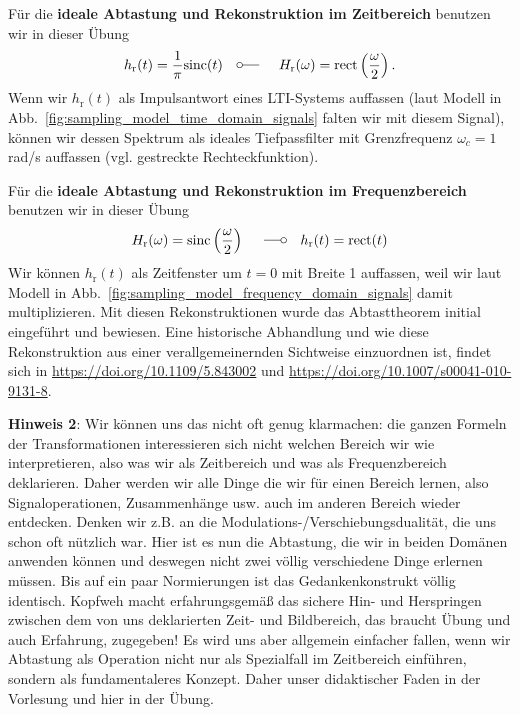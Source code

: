 Für die \textbf{ideale Abtastung und Rekonstruktion im Zeitbereich} benutzen
wir in dieser Übung
\begin{align}
h_\mathrm{r}(t) = \frac{1}{\pi}\text{sinc}(t)
\quad\fourier\quad
H_\mathrm{r}(\omega) = \text{rect}\left(\frac{\omega}{2}\right).
\end{align}
Wenn wir $h_\mathrm{r}(t)$ als Impulsantwort eines LTI-Systems auffassen (laut
Modell in Abb.~\ref{fig:sampling_model_time_domain_signals} falten wir mit diesem Signal), können wir
dessen Spektrum als ideales Tiefpassfilter mit Grenzfrequenz $\omega_c=1$ rad/s auffassen (vgl. gestreckte Rechteckfunktion).
%

Für die \textbf{ideale Abtastung und Rekonstruktion im Frequenzbereich} benutzen
wir in dieser Übung
\begin{align}
H_\mathrm{r}(\omega) = \text{sinc}\left( \frac{\omega}{2} \right)
\quad\Fourier\quad
h_\mathrm{r}(t)  = \text{rect}(t)
\end{align}
Wir können $h_\mathrm{r}(t)$ als Zeitfenster um $t=0$ mit Breite 1 auffassen,
weil wir laut Modell in Abb.~\ref{fig:sampling_model_frequency_domain_signals}
damit multiplizieren.
Mit diesen Rekonstruktionen wurde das Abtasttheorem initial eingeführt und
bewiesen. Eine historische Abhandlung und wie diese Rekonstruktion
aus einer verallgemeinernden Sichtweise einzuordnen ist, findet sich in
\url{https://doi.org/10.1109/5.843002} und
\url{https://doi.org/10.1007/s00041-010-9131-8}.

\textbf{Hinweis 2}: Wir können uns das nicht oft genug klarmachen: die ganzen
Formeln der Transformationen interessieren sich nicht welchen Bereich wir wie
interpretieren,
also was wir als Zeitbereich und was als Frequenzbereich deklarieren. Daher werden
wir alle Dinge die wir für einen Bereich lernen, also Signaloperationen, Zusammenhänge usw.
auch im anderen Bereich wieder entdecken. Denken wir z.B.
an die Modulations-/Verschiebungsdualität,
die uns schon oft nützlich war.
Hier ist es nun die Abtastung, die wir in beiden Domänen anwenden können und
deswegen nicht zwei völlig verschiedene Dinge erlernen müssen. Bis auf ein
paar Normierungen ist das Gedankenkonstrukt völlig identisch. Kopfweh macht
erfahrungsgemäß das sichere Hin- und Herspringen zwischen dem von uns deklarierten
Zeit- und Bildbereich,
das braucht Übung und auch Erfahrung, zugegeben! Es wird uns aber allgemein
einfacher fallen, wenn wir Abtastung als Operation
nicht nur als Spezialfall im Zeitbereich einführen, sondern als fundamentaleres
Konzept. Daher unser didaktischer Faden in der Vorlesung und hier in der
Übung.



